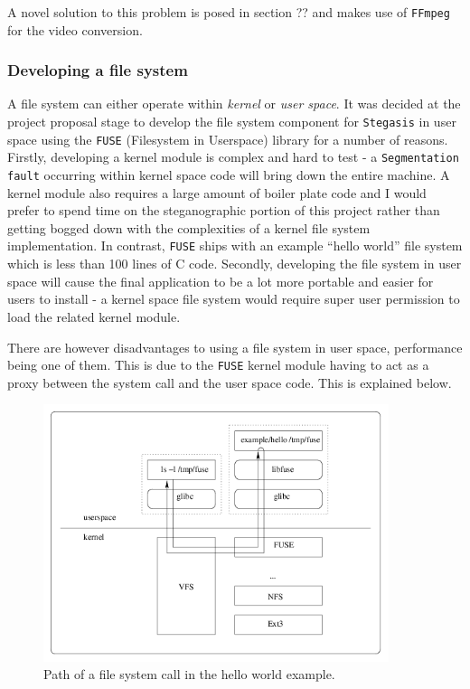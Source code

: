 \documentclass[paper=a4, fontsize=11pt,twoside]{scrartcl}    %
\numberwithin{table}{section}
\numberwithin{figure}{section}
\begin{document}
A novel solution to this problem is posed in section ?? and makes use of \texttt{FFmpeg} for the video conversion.

\subsubsection{Developing a file system}
\label{fs}

A file system can either operate within \textit{kernel} or \textit{user space}. It was decided at the project proposal stage to develop the file system component for \texttt{Stegasis} in user space using the \texttt{FUSE} (Filesystem in Userspace) library for a number of reasons. Firstly, developing a kernel module is complex and hard to test - a \texttt{Segmentation fault} occurring within kernel space code will bring down the entire machine. A kernel module also requires a large amount of boiler plate code and I would prefer to spend time on the steganographic portion of this project rather than getting bogged down with the complexities of a kernel file system implementation. In contrast, \texttt{FUSE} ships with an example ``hello world'' file system which is less than 100 lines of C code. Secondly, developing the file system in user space will cause the final application to be a lot more portable and easier for users to install - a kernel space file system would require super user permission to load the related kernel module.

There are however disadvantages to using a file system in user space, performance being one of them. This is due to the \texttt{FUSE} kernel module having to act as a proxy between the system call and the user space code. This is explained below.

\begin{figure}[here]
\centerline{\includegraphics[width=0.9\textwidth]{images/fuse_structure.png}}
\caption{Path of a file system call in the hello world example.}
\label{fig:fuse}
\end{figure}
\end{document}
